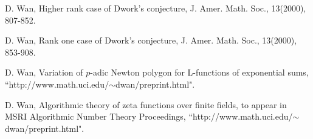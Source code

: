 \documentclass[10XSpt]{article}
\begin{document}
\begin{thebibliography}{[MT1]}
%
 D. Wan, Higher rank case of Dwork's conjecture, J. Amer. Math. Soc.,
13(2000), 807-852.

%
 D. Wan, Rank one case of Dwork's conjecture,
J. Amer. Math. Soc., 13(2000), 853-908.


%
 D. Wan, Variation of $p$-adic Newton polygon for L-functions 
of exponential sums, ``http://www.math.uci.edu/{$\sim$}dwan/preprint.html". 

%
 D. Wan, Algorithmic theory of zeta functions over finite fields, 
to appear in MSRI Algorithmic Number Theory Proceedings, 
``http://www.math.uci.edu/{$\sim$}dwan/preprint.html". 




\end{thebibliography}
\end{document}
